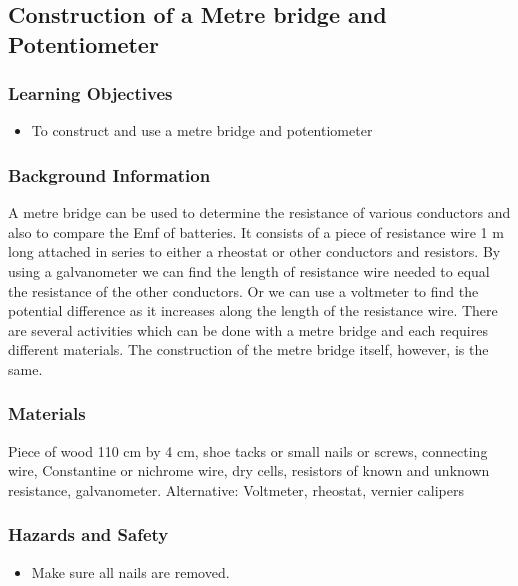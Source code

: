 \subsection{Construction of a Metre bridge and Potentiometer}

\subsubsection*{Learning Objectives}
\begin{itemize}
\item{To construct and use a metre bridge and potentiometer} 
\end{itemize}

\subsubsection*{Background Information}
A metre bridge can be used to determine the resistance of various conductors and also to compare the Emf of batteries. It consists of a piece of resistance wire 1 m long attached in series to either a rheostat or other conductors and resistors. By using a galvanometer we can find the length of resistance wire needed to equal the resistance of the other conductors. Or we can use a voltmeter to find the potential difference as it increases along the length of the resistance wire. There are several activities which can be done with a metre bridge and each requires different materials. The construction of the metre bridge itself, however, is the same.  

\subsubsection*{Materials}
Piece of wood 110 cm by 4 cm, shoe tacks or small nails or screws, connecting wire, Constantine or nichrome wire, dry cells, resistors of known and unknown resistance, galvanometer. Alternative: Voltmeter, rheostat, vernier calipers

\subsubsection*{Hazards and Safety}
\begin{itemize}
\item{Make sure all nails are removed.} 
\end{itemize}

